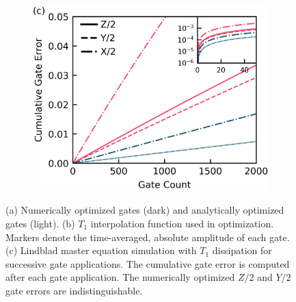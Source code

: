 \begin{figure}[ht]
\begin{subfigure}{.23\textwidth}
    \caption{\label{fig:longitudeb}}
  \end{subfigure}\hfill
  \begin{subfigure}{.4\textwidth}
    \includegraphics[width=\linewidth]{assets/f1c.png}
    \caption{\label{fig:longitudec}}
  \end{subfigure}
  \caption{
    (a) Numerically optimized gates (dark) and analytically optimized gates (light).
    (b) $T_{1}$ interpolation function used in optimization. Markers
    denote the time-averaged, absolute amplitude of each gate.
    (c) Lindblad master equation simulation with $T_{1}$ dissipation
    for successive gate applications. The cumulative
    gate error is computed after each gate application.
    The numerically optimized $Z/2$ and $Y/2$ gate errors are indistinguishable.
  }
  \label{fig:longitude}
\end{figure}


